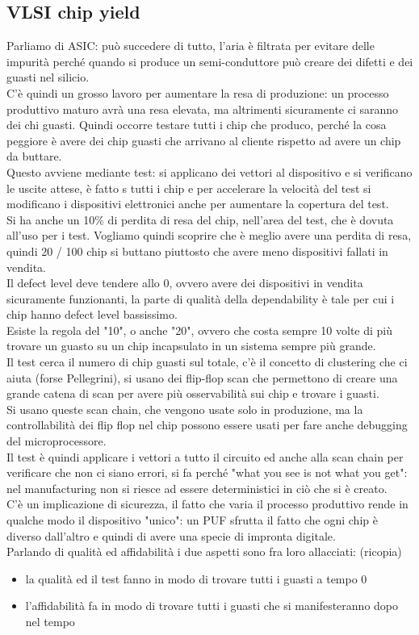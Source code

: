 \documentclass[oneside, 12pt]{extbook}
\begin{document}
\subsection{VLSI chip yield}
Parliamo di ASIC: può succedere di tutto, l'aria è filtrata per evitare delle impurità perché quando si produce un semi-conduttore può creare dei difetti e dei guasti nel silicio.
\\C'è quindi un grosso lavoro per aumentare la resa di produzione: un processo produttivo maturo avrà una resa elevata, ma altrimenti sicuramente ci saranno dei chi guasti. Quindi occorre testare tutti i chip che produco, perché la cosa peggiore è avere dei chip guasti che arrivano al cliente rispetto ad avere un chip da buttare.
\\Questo avviene mediante test: si applicano dei vettori al dispositivo e si verificano le uscite attese, è fatto s tutti i chip e per accelerare la velocità del test si modificano i dispositivi elettronici anche per aumentare la copertura del test.
\\Si ha anche un 10\% di perdita di resa del chip, nell'area del test, che è dovuta all'uso per i test. Vogliamo quindi scoprire che è meglio avere una perdita di resa, quindi 20 / 100 chip si buttano piuttosto che avere meno dispositivi fallati in vendita.
\\ Il defect level deve tendere allo 0, ovvero avere dei dispositivi in vendita sicuramente funzionanti, la parte di qualità della dependability è tale per cui i chip hanno defect level bassissimo.
\\Esiste la regola del "10", o anche "20", ovvero che costa sempre 10 volte di più trovare un guasto su un chip incapsulato in un sistema sempre più grande.
\\Il test cerca il numero di chip guasti sul totale, c'è il concetto di clustering che ci aiuta (forse Pellegrini), si usano dei flip-flop scan che permettono di creare una grande catena di scan per avere più osservabilità sui chip e trovare i guasti.\\Si usano queste scan chain, che vengono usate solo in produzione, ma la controllabilità dei flip flop nel chip possono essere usati per fare anche debugging del microprocessore.
\\Il test è quindi applicare i vettori a tutto il circuito ed anche alla scan chain per verificare che non ci siano errori, si fa perché "what you see is not what you get": nel manufacturing non si riesce ad essere deterministici in ciò che si è creato.
\\C'è un implicazione di sicurezza, il fatto che varia il processo produttivo rende in qualche modo il dispositivo "unico": un PUF sfrutta il fatto che ogni chip è diverso dall'altro e quindi di avere una specie di impronta digitale.\\
Parlando di qualità ed affidabilità i due aspetti sono fra loro allacciati: (ricopia)
\begin{itemize}
	\item la qualità ed il test fanno in modo di trovare tutti i guasti a tempo 0
	\item l'affidabilità fa in modo di trovare tutti i guasti che si manifesteranno dopo nel tempo
\end{itemize}
\end{document}
